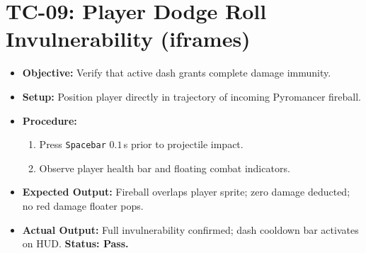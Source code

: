 \section{TC-09: Player Dodge Roll Invulnerability (iframes)}
\begin{itemize}
    \item \textbf{Objective:} Verify that active dash grants complete damage immunity.
    \item \textbf{Setup:} Position player directly in trajectory of incoming Pyromancer fireball.
    \item \textbf{Procedure:}
    \begin{enumerate}
        \item Press \texttt{Spacebar} $0.1$\,s prior to projectile impact.
        \item Observe player health bar and floating combat indicators.
    \end{enumerate}
    \item \textbf{Expected Output:} Fireball overlaps player sprite; zero damage deducted; no red damage floater pops.
    \item \textbf{Actual Output:} Full invulnerability confirmed; dash cooldown bar activates on HUD. \textbf{Status: Pass.}
\end{itemize}
